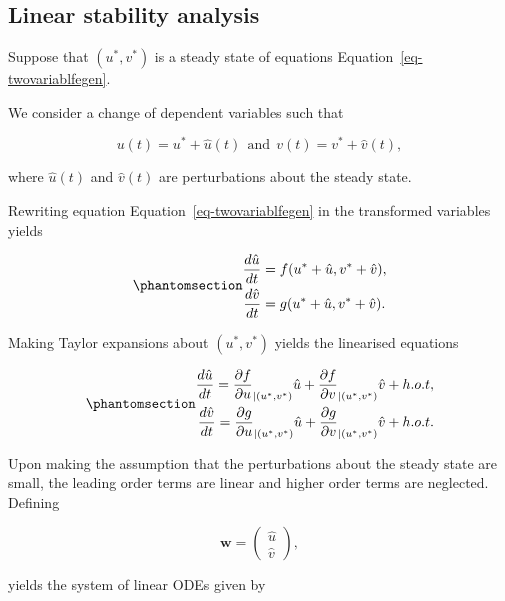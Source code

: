 \documentclass[
  letterpaper,
  DIV=11,
  numbers=noendperiod]{scrreprt}
\begin{document}
\subsection{Linear stability
analysis}\label{linear-stability-analysis-4}

Suppose that \((u^*,v^*)\) is a steady state of equations
Equation~\ref{eq-twovariablfegen}.

We consider a change of dependent variables such that

\[
u(t)=u^*+ \hat{u}(t)  \  \  \textrm{and} \ \ v(t)=v^*+\hat{v}(t),
\]

where \(\hat{u}(t)\) and \(\hat{v}(t)\) are perturbations about the
steady state.

Rewriting equation Equation~\ref{eq-twovariablfegen} in the transformed
variables yields

\begin{equation}\protect\phantomsection\label{eq-twovariablfegentrans}{
\begin{aligned}
\frac{d\hat{u}}{dt}&=f(u^*+\hat{u},v^*+\hat{v}),  \nonumber \\
\frac{d\hat{v}}{dt}&=g(u^*+\hat{u},v^*+\hat{v}).
\end{aligned}
}\end{equation}

Making Taylor expansions about \((u^*,v^*)\) yields the linearised
equations

\begin{equation}\protect\phantomsection\label{eq-twovariablfegenlin}{
\begin{aligned}
\frac{d\hat{u}}{dt}=\frac{\partial f}{\partial u}_{|(u^*,v^*)} \hat{u} +  \frac{\partial f}{\partial v}_{|(u^*,v^*)}  \hat{v} + h.o.t, \nonumber\\
\frac{d\hat{v}}{dt}=\frac{\partial g}{\partial u}_{|(u^*,v^*)}  \hat{u} +  \frac{\partial g}{\partial v}_{|(u^*,v^*)}  \hat{v} + h.o.t. \nonumber
\end{aligned}
}\end{equation}

Upon making the assumption that the perturbations about the steady state
are small, the leading order terms are linear and higher order terms are
neglected. Defining

\[
\mathbf{w}=\left
(\begin{array}{r}
\hat{u} \\ 
\hat{v} 
\end{array}\right),
\]

yields the system of linear ODEs given by
\end{document}
